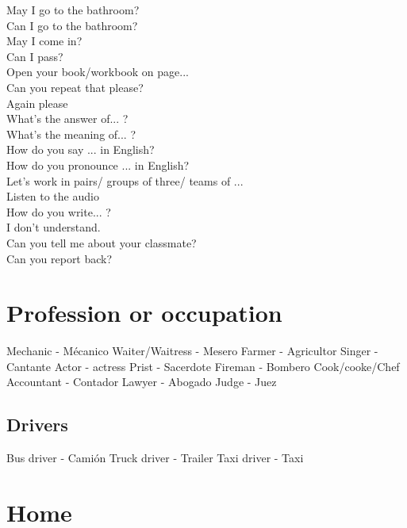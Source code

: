 \documentclass[12pt,openany]{book}
\begin{document}
		\begin{multicols}{2}
			May I go to the bathroom?							\\
			Can I go to the bathroom?							\\
			May I come in?										\\
			Can I pass?											\\
			Open your book/workbook on page...					\\
			Can you repeat that please?							\\
			Again please										\\
			What's the answer of... ?							\\
		\columnbreak
			What's the meaning of... ?							\\
			How do you say ... in English?						\\
			How do you pronounce ... in English?				\\
			Let's work in pairs/ groups of three/ teams of ...	\\
			Listen to the audio									\\	
			How do you write... ?								\\
			I don't understand.									\\
			Can you tell me about your classmate?				\\
			Can you report back?								\\
		\end{multicols}

	\section{Profession or occupation}

		\begin{multicols}{2}
			Mechanic - Mécanico
			Waiter/Waitress - Mesero
			Farmer - Agricultor
			Singer - Cantante
			Actor - actress
		\columnbreak
			Prist - Sacerdote
			Fireman - Bombero
			Cook/cooke/Chef
			Accountant - Contador
			Lawyer - Abogado
			Judge - Juez
		\end{multicols}

		\subsection{Drivers}
		
			Bus driver - Camión
			Truck driver - Trailer
			Taxi driver - Taxi

	\section{Home}
\end{document}
